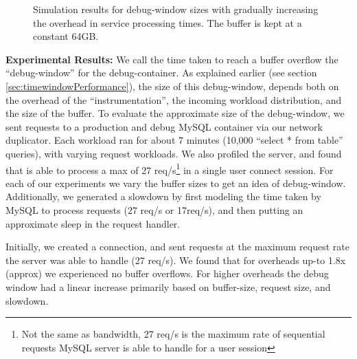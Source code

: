 \begin{figure}[ht]
\begin{adjustbox}{max size={.5\textwidth}}
	\end{adjustbox}
	\captionsetup{justification=centering}
	\caption{Simulation results for debug-window sizes with gradually increasing the overhead in service processing times. The buffer is kept at a constant 64GB.}
	\label{fig:debugSim}
\end{figure}

\noindent
\textbf{Experimental Results:} We call the time taken to reach a buffer overflow the ``debug-window'' for the debug-container.
As explained earlier (see section \ref{sec:timewindowPerformance}), the size of this debug-window, depends both on the overhead of the ``instrumentation'', the incoming workload distribution, and the size of the buffer.
To evaluate the approximate size of the debug-window, we sent requests to a production and debug MySQL container via our network duplicator.
Each workload ran for about 7 minutes (10,000 ``select * from table'' queries), with varying request workloads.
We also profiled the server, and found that is able to process a max of 27 req/s\footnote{Not the same as bandwidth, 27 req/s is the maximum rate of sequential requests MySQL server is able to handle for a user session} in a single user connect session. 
For each of our experiments we vary the buffer sizes to get an idea of debug-window. 
Additionally, we generated a slowdown by first modeling the time taken by MySQL to process requests (27 req/s or 17req/s), and then putting an approximate sleep in the request handler.

Initially, we created a connection, and sent requests at the maximum request rate the server was able to handle (27 req/s).
We found that for overheads up-to 1.8x (approx) we experienced no buffer overflows.
For higher overheads the debug window had a linear increase primarily based on buffer-size, request size, and slowdown.

